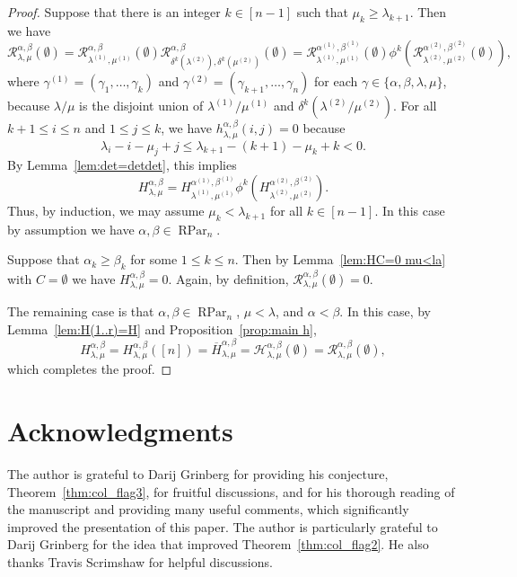 \documentclass[12pt]{amsart}
\numberwithin{equation}{section}
\theoremstyle{definition}
\newcommand\ovH{\overline{H}}
\newcommand\RPar{\operatorname{RPar}}
\newcommand\lm{{\lambda/\mu}}
\newcommand\R{\mathcal{R}}
\newcommand\HH{\mathcal{H}}
\begin{document}
\begin{proof}
  Suppose that there is an integer $k\in[n-1]$ such that $\mu_k\ge
  \lambda_{k+1}$. Then we have
  \[
    \R_{\lambda,\mu}^{\alpha,\beta}(\emptyset) =
    \R_{\lambda^{(1)},\mu^{(1)}}^{\alpha,\beta}(\emptyset)
    \R_{\delta^k(\lambda^{(2)}),\delta^k(\mu^{(2)})}^{\alpha,\beta}(\emptyset)=
    \R_{\lambda^{(1)},\mu^{(1)}}^{\alpha^{(1)},\beta^{(1)}}(\emptyset)
    \phi^k\left(\R_{\lambda^{(2)},\mu^{(2)}}^{\alpha^{(2)},\beta^{(2)}}(\emptyset)\right),
  \]
  where $\gamma^{(1)}=(\gamma_1,\dots,\gamma_k)$ and
  $\gamma^{(2)}=(\gamma_{k+1},\dots,\gamma_n)$ for each
  $\gamma\in\{\alpha,\beta,\lambda,\mu\}$, because $\lm$ is the disjoint union
  of $\lambda^{(1)}/\mu^{(1)}$ and $\delta^k(\lambda^{(2)}/\mu^{(2)})$. For all
  $k+1\le i\le n$ and $1\le j\le k$, we have
  $h^{\alpha,\beta}_{\lambda,\mu}(i,j)=0$ because
 \[
    \lambda_i-i-\mu_j+j \le \lambda_{k+1}-(k+1)-\mu_k+k <0.
  \]
  By Lemma~\ref{lem:det=detdet}, this implies
  \[
    H_{\lambda,\mu}^{\alpha,\beta} = H_{\lambda^{(1)},\mu^{(1)}}^{\alpha^{(1)},\beta^{(1)}}
    \phi^k\left(H_{\lambda^{(2)},\mu^{(2)}}^{\alpha^{(2)},\beta^{(2)}}\right).
  \]
  Thus, by induction, we may assume $\mu_k<\lambda_{k+1}$ for all $k\in[n-1]$.
  In this case by assumption we have $\alpha,\beta\in\RPar_n$.




  Suppose that $\alpha_k\ge\beta_k$ for some $1\le k\le n$. Then by
  Lemma~\ref{lem:HC=0 mu<la} with $C=\emptyset$ we have
  $H_{\lambda,\mu}^{\alpha,\beta}=0$. Again, by definition,
  $\R_{\lambda,\mu}^{\alpha,\beta}(\emptyset)=0$.

  The remaining case is that $\alpha,\beta\in\RPar_n$, $\mu<\lambda$, and
  $\alpha<\beta$. In this case, by Lemma~\ref{lem:H(1..r)=H} and
  Proposition~\ref{prop:main h},
  \[
    H_{\lambda,\mu}^{\alpha,\beta} = H_{\lambda,\mu}^{\alpha,\beta}([n]) =
    \ovH_{\lambda,\mu}^{\alpha,\beta} = 
    \HH_{\lambda,\mu}^{\alpha,\beta}(\emptyset) = 
    \R_{\lambda,\mu}^{\alpha,\beta}(\emptyset),
  \]
which completes the proof. 
\end{proof}


\section*{Acknowledgments}
The author is grateful to Darij Grinberg for providing his conjecture,
Theorem~\ref{thm:col_flag3}, for fruitful discussions, and for his thorough
reading of the manuscript and providing many useful comments, which
significantly improved the presentation of this paper. The author is
particularly grateful to Darij Grinberg for the idea that improved
Theorem~\ref{thm:col_flag2}. He also thanks Travis Scrimshaw for helpful
discussions.
\end{document}

